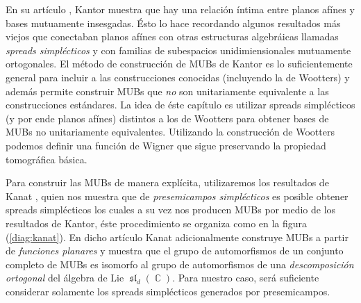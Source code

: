 \documentclass[a4paper]{report}
\DeclareMathOperator{\C}{\mathbb{C}}
\DeclareMathOperator{\Sl}{\mathfrak{sl}}
\begin{document}
  En su artículo \cite{kantor2012}, Kantor muestra que hay
  una relación íntima entre planos afínes y bases mutuamente
  insesgadas.  Ésto lo hace recordando algunos resultados
  más viejos que conectaban planos afínes con otras
  estructuras algebráicas llamadas \textit{spreads
  simplécticos} y con familias de subespacios
  unidimiensionales mutuamente ortogonales.  El método de
  construcción de MUBs de Kantor es lo suficientemente
  general para incluir a las construcciones conocidas
  (incluyendo la de Wootters) y además permite construir
  MUBs que \textit{no} son unitariamente equivalente a las
  construcciones estándares. La idea de éste capítulo es
  utilizar spreads simplécticos (y por ende planos afínes)
  distintos a los de Wootters para obtener bases de MUBs no
  unitariamente equivalentes. Utilizando la construcción de
  Wootters podemos definir una función de Wigner que sigue
  preservando la propiedad tomográfica básica. 

  Para construir las MUBs de manera explícita, utilizaremos
  los resultados de Kanat \cite{abdukhalikov2015}, quien nos
  muestra que de \textit{presemicampos simplécticos} es
  posible obtener spreads simplécticos los cuales a su vez
  nos producen MUBs por medio de los resultados de Kantor,
  éste procedimiento se organiza como en la figura
  (\ref{diag:kanat}).  En dicho artículo Kanat
  adicionalmente construye MUBs a partir de
  \textit{funciones planares} y muestra que el grupo de
  automorfismos de un conjunto completo de MUBs es isomorfo
  al grupo de automorfismos de una \textit{descomposición
  ortogonal} del álgebra de Lie $\Sl_d(\C)$. Para nuestro
  caso, será suficiente considerar solamente los spreads
  simplécticos generados por presemicampos.
\end{document}
